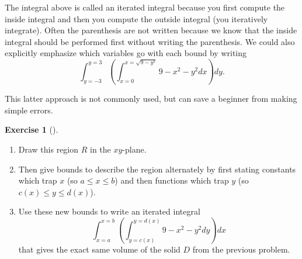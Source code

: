\documentclass[10pt,]{book}
\theoremstyle{plain}
\theoremstyle{definition}
\theoremstyle{definition}
\theoremstyle{definition}
\theoremstyle{definition}
\newtheorem{exploration}[project]{Exercise}
\theoremstyle{definition}
\numberwithin{equation}{section}
\newcommand{\ds}{\displaystyle}
\begin{document}
The integral above is called an iterated integral because you first compute the inside integral and then you compute the outside integral (you iteratively integrate). Often the parenthesis are not written because we know that the inside integral should be performed first without writing the parenthesis. We could also explicitly emphasize which variables go with each bound by writing%
\begin{equation*}
\ds\int_{y=-3}^{y=3} \left(\int_{x=0}^{x=\sqrt{9-y^2}}9-x^2-y^2 dx\right) dy.
\end{equation*}
%
\par
This latter approach is not commonly used, but can save a beginner from making simple errors.%
\begin{exploration}[]\label{exploration-248}
\leavevmode%
\begin{enumerate}[font=\bfseries,label=(\alph*),ref=\alph*]
\item\label{task-668} Draw this region \(R\) in the \(xy\)-plane.%
\item\label{task-669} Then give bounds to describe the region alternately by first stating constants which trap \(x\) (so \(a\leq x\leq b\)) and then functions which trap \(y\) (so \(c(x)\leq y \leq d(x)\)).%
\item\label{task-670} Use these new bounds to write an iterated integral%
\begin{equation*}
\ds\int_{x=a}^{x=b} \left(\int_{y=c(x)}^{y=d(x)}9-x^2-y^2 dy\right) dx
\end{equation*}
that gives the exact same volume of the solid \(D\) from the previous problem.%
\end{enumerate}
\end{exploration}
\end{document}
